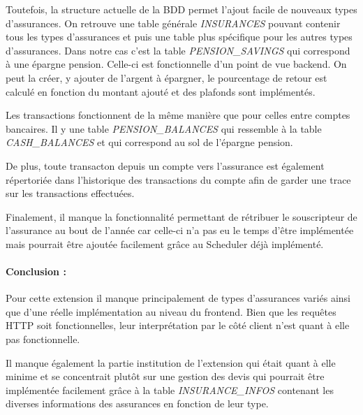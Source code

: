 \documentclass[../rapport.tex]{subfiles}
\begin{document}
			\medskip

			Toutefois, la structure actuelle de la BDD permet l'ajout facile de nouveaux types
			d'assurances. On retrouve une table générale \textit{INSURANCES} pouvant contenir
			tous les types d'assurances et puis une table plus spécifique pour les autres types
			d'assurances. Dans notre cas c'est la table \textit{PENSION\_SAVINGS} qui correspond
			à une épargne pension. Celle-ci est fonctionnelle d'un point de vue backend.
			On peut la créer, y ajouter de l'argent à épargner, le pourcentage de retour 
			est calculé en fonction du montant ajouté et des plafonds sont implémentés.

			\medskip

			Les transactions fonctionnent de la même manière que pour celles entre comptes
			bancaires. Il y une table \textit{PENSION\_BALANCES} qui ressemble à la table
			\textit{CASH\_BALANCES} et qui correspond au sol de l'épargne pension. 
			
			\medskip

			De plus, toute transacton depuis un compte vers l'assurance est également répertoriée
			dans l'historique des transactions du compte afin de garder une trace sur les 
			transactions effectuées.

			\medskip

			Finalement, il manque la fonctionnalité permettant de rétribuer le souscripteur 
			de l'assurance au bout de l'année car celle-ci n'a pas eu le temps d'être implémentée
			mais pourrait être ajoutée facilement grâce au Scheduler déjà implémenté.


			\bigskip

			\paragraph{Conclusion : } Pour cette extension il manque principalement de types
			d'assurances variés ainsi que d'une réelle implémentation au niveau du frontend.
			Bien que les requêtes HTTP soit fonctionnelles, leur interprétation par le côté 
			client n'est quant à elle pas fonctionnelle.

			\medskip

			Il manque également la partie institution de l'extension qui était quant à elle
			minime et se concentrait plutôt sur une gestion des devis qui pourrait être
			implémentée facilement grâce à la table \textit{INSURANCE\_INFOS} contenant les
			diverses informations des assurances en fonction de leur type.
			
\end{document}

